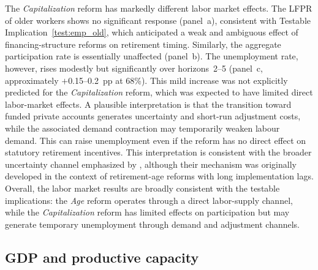 \documentclass[11pt,english,a4paper, twoside, authoryear]{article}
\begin{document}
The \textit{Capitalization} reform has markedly different labor market effects. The LFPR of older workers shows no significant response (panel~a), consistent with Testable Implication~\ref{test:emp_old}, which anticipated a weak and ambiguous effect of financing-structure reforms on retirement timing. Similarly, the aggregate participation rate is essentially unaffected (panel~b). The unemployment rate, however, rises modestly but significantly over horizons~2--5 (panel~c, approximately $+$0.15--0.2~pp at 68\%). This mild increase was not explicitly predicted for the \textit{Capitalization} reform, which was expected to have limited direct labor-market effects. A plausible interpretation is that the transition toward funded private accounts generates uncertainty and short-run adjustment costs, while the associated demand contraction may temporarily weaken labour demand. This can raise unemployment even if the reform has no direct effect on statutory retirement incentives. This interpretation is consistent with the broader uncertainty channel emphasized by \citet{BiZubairy2023}, although their mechanism was originally developed in the context of retirement-age reforms with long implementation lags. Overall, the labor market results are broadly consistent with the testable implications: the \textit{Age} reform operates through a direct labor-supply channel, while the \textit{Capitalization} reform has limited effects on participation but may generate temporary unemployment through demand and adjustment channels.

\FloatBarrier
\subsection{GDP and productive capacity}
\label{sec:gdp}
\label{sec:gdp}
\end{document}
